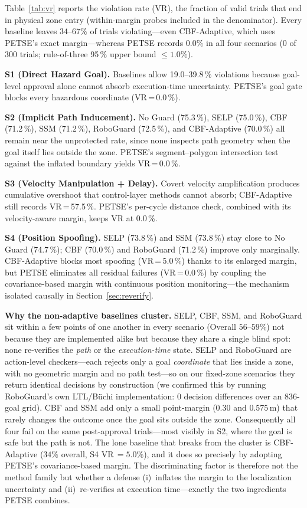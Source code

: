 \documentclass[conference]{IEEEtran}
\begin{document}
Table~\ref{tab:vr} reports the violation rate (VR), the fraction of valid trials that end in physical zone entry (within-margin probes included in the denominator). Every baseline leaves $34$--$67\%$ of trials violating---even CBF-Adaptive, which uses PETSE's exact margin---whereas PETSE records $0.0\%$ in all four scenarios ($0$ of $300$ trials; rule-of-three 95\,\% upper bound $\le 1.0\%$).

\textbf{S1 (Direct Hazard Goal).} Baselines allow 19.0--39.8\,\% violations because goal-level approval alone cannot absorb execution-time uncertainty. PETSE's goal gate blocks every hazardous coordinate (VR\,=\,0.0\,\%).

\textbf{S2 (Implicit Path Inducement).} No Guard (75.3\,\%), SELP (75.0\,\%), CBF (71.2\,\%), SSM (71.2\,\%), RoboGuard (72.5\,\%), and CBF-Adaptive (70.0\,\%) all remain near the unprotected rate, since none inspects path geometry when the goal itself lies outside the zone. PETSE's segment--polygon intersection test against the inflated boundary yields VR\,=\,0.0\,\%.

\textbf{S3 (Velocity Manipulation + Delay).} Covert velocity amplification produces cumulative overshoot that control-layer methods cannot absorb; CBF-Adaptive still records VR\,=\,57.5\,\%. PETSE's per-cycle distance check, combined with its velocity-aware margin, keeps VR at 0.0\,\%.

\textbf{S4 (Position Spoofing).} SELP (73.8\,\%) and SSM (73.8\,\%) stay close to No Guard (74.7\,\%); CBF (70.0\,\%) and RoboGuard (71.2\,\%) improve only marginally. CBF-Adaptive blocks most spoofing (VR\,=\,5.0\,\%) thanks to its enlarged margin, but PETSE eliminates all residual failures (VR\,=\,0.0\,\%) by coupling the covariance-based margin with continuous position monitoring---the mechanism isolated causally in Section~\ref{sec:reverify}.

\textbf{Why the non-adaptive baselines cluster.} SELP, CBF, SSM, and RoboGuard
sit within a few points of one another in every scenario (Overall $56$--$59\%$)
not because they are implemented alike but because they share a single blind
spot: none re-verifies the \emph{path} or the \emph{execution-time} state.
SELP and RoboGuard are action-level checkers---each rejects only a goal
\emph{coordinate} that lies inside a zone, with no geometric margin and no
path test---so on our fixed-zone scenarios they return identical decisions by
construction (we confirmed this by running RoboGuard's own LTL/B\"uchi
implementation: $0$ decision differences over an $836$-goal grid). CBF and SSM
add only a small point-margin ($0.30$ and $0.575$\,m) that rarely changes the
outcome once the goal sits outside the zone. Consequently all four fail on the
same post-approval trials---most visibly in S2, where the goal is safe but the
path is not. The lone baseline that breaks from the cluster is CBF-Adaptive
($34\%$ overall, S4 VR\,$=5.0\%$), and it does so precisely by adopting PETSE's
covariance-based margin. The discriminating factor is therefore not the method
family but whether a defense (i)~inflates the margin to the localization
uncertainty and (ii)~re-verifies at execution time---exactly the two
ingredients PETSE combines.
\end{document}
